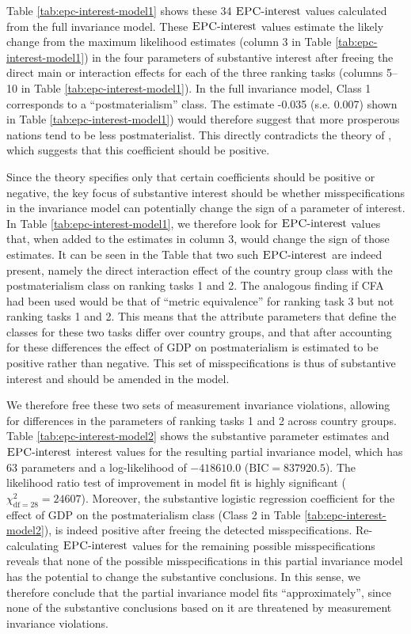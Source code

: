 \documentclass[letterpaper,12pt]{article}
\newcommand{\da}{\textrm{{\sc {EPC}}-interest}}
\begin{document}
Table \ref{tab:epc-interest-model1} shows these 34 $\da{}$ values calculated from the full invariance model. These $\da{}$ values estimate the likely change from the maximum likelihood estimates (column 3 in Table \ref{tab:epc-interest-model1}) in the four parameters of substantive interest after freeing the direct main or interaction effects for each of the three ranking tasks (columns 5--10 in  Table \ref{tab:epc-interest-model1}). In the full invariance model, Class 1 corresponds to a ``postmaterialism'' class. The estimate -0.035 (s.e. 0.007) shown in Table \ref{tab:epc-interest-model1}) would therefore suggest that more prosperous nations tend to be less postmaterialist. This directly contradicts the theory of \citet{inglehart1997modernization}, which suggests that this coefficient should be positive. 

Since the theory specifies only that certain coefficients should be positive or negative, the key focus of substantive interest should be whether misspecifications in the invariance model can potentially change the sign of a parameter of interest. In Table \ref{tab:epc-interest-model1}, we therefore look for $\da{}$ values that, when added to the estimates in column 3, would change the sign of those estimates. It can be seen in the Table that two such $\da{}$ are indeed present, namely the direct interaction effect of the country group class with the postmaterialism class on ranking tasks 1 and 2. The analogous finding \citep{kankaras2011measurement} if CFA had been used would be that of ``metric equivalence'' for ranking task 3 but not ranking tasks 1 and 2.  This means that the attribute parameters that define the classes for these two tasks differ over country groups, and that after accounting for these differences the effect of GDP on postmaterialism is estimated to be positive rather than negative. This set of misspecifications is thus of substantive interest and should be amended in the model. 

We therefore free these two sets of measurement invariance violations, allowing for differences in the parameters of ranking tasks 1 and 2 across country groups. Table \ref{tab:epc-interest-model2} shows the substantive parameter estimates and $\da{}$ interest values for the resulting partial invariance model, which has 63 parameters and a log-likelihood of $-418610.0$ ($\text{BIC} = 837920.5$). The likelihood ratio test of improvement in model fit is highly significant ($\chi^2_{\text{df} = 28} = 24607$). Moreover, the substantive logistic regression coefficient for the effect of GDP on the postmaterialism class (Class 2 in Table \ref{tab:epc-interest-model2}), is indeed positive after freeing the detected misspecifications. Re-calculating $\da{}$ values for the remaining possible misspecifications reveals that none of the possible misspecifications in this partial invariance model has the potential to change the substantive conclusions. In this sense, we therefore conclude that the partial invariance model fits ``approximately'', since none of the substantive conclusions based on it are threatened by measurement invariance violations.
\end{document}

